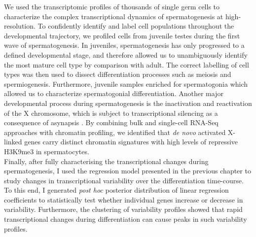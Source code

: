 We used the transcriptomic profiles of thousands of single germ cells to characterize the complex transcriptional dynamics of spermatogenesis at high-resolution. To confidently identify and label cell populations throughout the developmental trajectory, we profiled cells from juvenile testes during the first wave of spermatogenesis. In juveniles, spermatogenesis has only progressed to a defined developmental stage, and therefore allowed us to unambiguously identify the most mature cell type by comparison with adult. The correct labelling of cell types was then used to dissect differentiation processes such as meiosis and spermiogenesis. Furthermore, juvenile samples enriched for spermatogonia which allowed us to characterize spermatogonial differentiation. Another major developmental process during spermatogenesis is the inactivation and reactivation of the X chromosome, which is subject to transcriptional silencing as a consequence of asynapsis \citep{Turner2007}. By combining bulk and single-cell RNA-Seq approaches with chromatin profiling, we identified that \textit{de novo} activated X-linked genes carry distinct chromatin signatures with high levels of repressive H3K9me3 in spermatocytes. \\

Finally, after fully characterising the transcriptional changes during spermatogenesis, I used the regression model presented in the previous chapter to study changes in transcriptional variability over the differentiation time-course. To this end, I generated \emph{post hoc} posterior distribution of linear regression coefficients to statistically test whether individual genes increase or decrease in variability. Furthermore, the clustering of variability profiles showed that rapid transcriptional changes during differentiation can cause peaks in such variability profiles.
